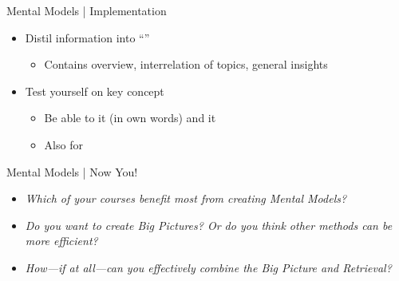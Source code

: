 \documentclass{ercisbeamer}
\begin{document}
\begin{frame}{Mental Models | Implementation}
    \begin{tbox}
        \begin{itemize}
            \item Distil information into ``''
            \begin{itemize}
                \item Contains overview, interrelation of topics, general insights
            \end{itemize}
            \item Test yourself on key concept
            \begin{itemize}
                \item Be able to  it (in own words) and  it
                \item Also for 
            \end{itemize}
        \end{itemize}
    \end{tbox}
\end{frame}
\setbgimage{}

\begin{frame}{Mental Models | Now You!}
    \begin{itemize}
        \item \emph{Which of your courses benefit most from creating Mental Models?}
        \item \emph{Do you want to create Big Pictures? Or do you think other methods can be more efficient?}
        \item \emph{How---if at all---can you effectively combine the Big Picture and Retrieval?}
    \end{itemize}
\end{frame}
\end{document}
